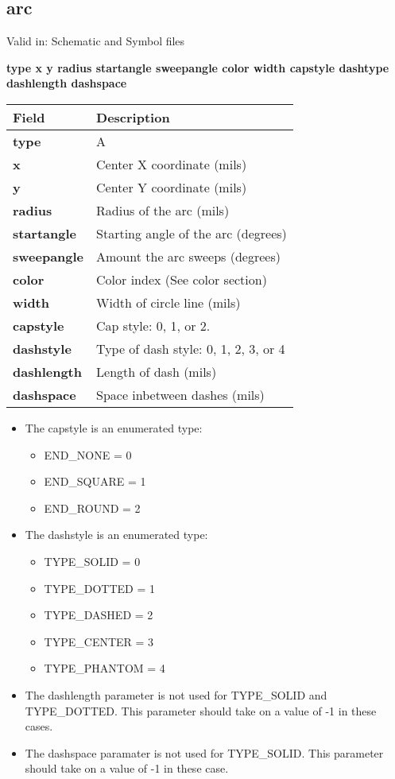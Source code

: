 \documentclass{article}
\begin{document}
\subsection{arc}

Valid in: Schematic and Symbol files

{\bf type x y radius startangle sweepangle color width capstyle dashtype dashlength dashspace }

\begin{table}[h]
\begin{tabular}{|l|l|} \hline
Field & Description \\ \hline \hline
{\bf type} & A \\ \hline
{\bf x} & Center X coordinate (mils) \\ \hline 
{\bf y} & Center Y coordinate (mils)\\ \hline
{\bf radius} & Radius of the arc (mils) \\ \hline
{\bf startangle} & Starting angle of the arc (degrees) \\ \hline
{\bf sweepangle} & Amount the arc sweeps (degrees) \\ \hline
{\bf color} & Color index (See color section) \\ \hline
{\bf width} & Width of circle line (mils) \\ \hline
{\bf capstyle} & Cap style: 0, 1, or 2. \\ \hline
{\bf dashstyle} & Type of dash style: 0, 1, 2, 3, or 4 \\ \hline
{\bf dashlength} & Length of dash (mils) \\ \hline
{\bf dashspace} & Space inbetween dashes (mils) \\ \hline
\end{tabular}
\end{table}

\begin{itemize}
\item The capstyle is an enumerated type: 
\begin{itemize}
	\item END\_NONE = 0
	\item END\_SQUARE = 1
	\item END\_ROUND = 2
\end{itemize}
\item The dashstyle is an enumerated type: 
\begin{itemize}
	\item TYPE\_SOLID = 0 
	\item TYPE\_DOTTED = 1
	\item TYPE\_DASHED = 2
	\item TYPE\_CENTER = 3
        \item TYPE\_PHANTOM = 4
\end{itemize}
\item The dashlength parameter is not used for TYPE\_SOLID and TYPE\_DOTTED.  
      This parameter should take on a value of -1 in these cases.
\item The dashspace paramater is not used for TYPE\_SOLID.
      This parameter should take on a value of -1 in these case.
\end{itemize}
\end{document}
